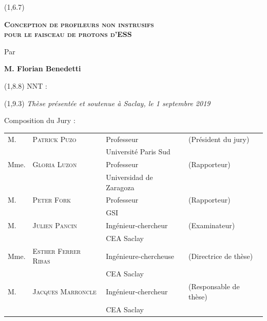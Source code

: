 \begin{titlepage}
	\begin{textblock}{14}(1,6.7)
		\begin{center}	
			\Large \textsc{\textcolor{ESSColor}{
					\textbf{Conception de profileurs non instrusifs \\pour le faisceau de protons d’ESS}}}\par
			\large Par\par  \large \textbf{M. Florian Benedetti} \par
		\end{center}
	\end{textblock}
	
	\begin{textblock}{13}(1,8.8)
		NNT : 
	\end{textblock}
	
	\begin{textblock}{14}(1,9.3)
		\vspace{1.5cm}
		\hspace{1cm}\textit{Thèse présentée et soutenue à Saclay, le 1 septembre 2019}
		\vspace{0.5cm}
		\par
		\hspace{1cm}Composition du Jury :
		\begin{center}
			\begin{tabular}{llll}
				M.    & \textsc{Patrick Puzo} & Professeur              & (Président du jury)            \\
				\null & \null                      &  Université Paris Sud              &                         \\   

        Mme.    & \textsc{Gloria Luzon}      & Professeur              & (Rapporteur)           \\
				\null & \null                      & Universidad de Zaragoza              &                         \\ 
        
				M.    & \textsc{Peter Fork}  & Professeur              & (Rapporteur)            \\
				\null & \null                      & GSI               &                         \\ 
				M.   & \textsc{Julien Pancin}& Ingénieur-chercheur & (Examinateur)   \\
        \null & \null                      & CEA Saclay              &                         \\ 				
				Mme.   & \textsc{Esther Ferrer Ribas}& Ingénieure-chercheuse & (Directrice de thèse)   \\
				\null & \null                      & CEA Saclay              &                         \\ 
				
				M.    & \textsc{Jacques Marroncle} & Ingénieur-chercheur     & (Responsable de thèse) \\
				\null & \null                      & CEA Saclay              &                         \\ 		
			\end{tabular}
		\end{center}
	\end{textblock}
\end{titlepage}